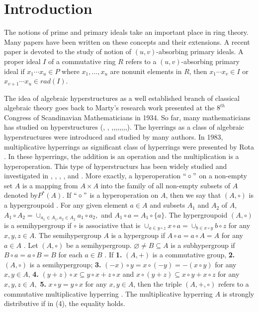 \documentclass[preprint,review,10pt]{amsart}
\theoremstyle{definition}
\theoremstyle{remark}
\numberwithin{equation}{section}
\begin{document}
\section{Introduction}
The notions of prime and primary ideals take an important place  in ring theory. Many papers have been written on these concepts and their extensions. A recent paper \cite{Khali} is devoted to the study of notion of $(u,v)$-absorbing  primary ideals. A proper ideal $I$ of a commutative ring $R$ refers to  a $(u,v)$-absorbing  primary ideal if    $x_1  \cdots  x_u \in  P$  where $x_1,\ldots,x_u$ are nonunit elements in $R$, then  $x_1  \cdots  x_v \in I$ or $x_{v+1}  \cdots  x_u \in rad(I)$.

The idea of algebraic hyperstructures as a well established branch of classical algebraic theory goes back to
Marty's research work \cite{marty} presented  at the $8^{th}$ Congress of Scandinavian Mathematicians in 1934. So far, many mathematicians has studied on hyperstructures  (\cite{f1}, \cite{f2}, \cite{f4},\cite{f5},\cite{x2},\cite{x1},\cite{f11},\cite{f7},\cite{f17},\cite{f8},\cite{f9}). The hyerrings as a  class of algebraic hyperstructures were introduced and studied by many authors. In 1983, multiplicative hyperrings as  significant class of hyperrings were presented by Rota \cite{f14}. In these hyperrings, the addition is an operation and the multiplication is a hyperoperation.  This type of hyperstructurs  has been widely studied and investigated in \cite{ameri}, \cite{ameri5}, \cite{ameri6},  \cite{Ciampi},  \cite{Kamali} and \cite{f16}. More exactly, a  hyperoperation $``\circ" $ on a non-empty set $A$ is a mapping from $A \times A$ into  the family of all non-empty subsets of $A$ denoted by$P^*(A)$.  If $``\circ" $ is a hyperoperation on  $A$, then we say that $(A,\circ)$  is a  hypergroupoid \cite{f10}.  For any given element $a \in A$ and subsets  $A_1$ and $A_2$ of $A$,  $A_1 \circ A_2 =\cup_{a_1 \in A_1, a_2 \in A_2}a_1 \circ a_2,$ and $ A_1 \circ a=A_1 \circ \{a\}.$  The  hypergroupoid $(A, \circ)$ is   a semihypergroup if $\circ$ is associative that is $\cup_{a \in y \circ z}x \circ a=\cup_{b \in x \circ y} b \circ z $ for any $x,y,z \in A$. The semihypergroup $A$ is  a hypergroup if  $A\circ a=a \circ A=A$ for any  $a \in A$ \cite{f10}. Let $(A,\circ)$ be a semihypergroup. $\varnothing \neq B \subseteq A$ is a subhypergroup if   $B \circ a=a \circ B=B$ for each $a \in B$ \cite{f10}.    If  {\bf 1.} $(A,+)$ is a commutative group,  {\bf 2.} $(A,\circ)$ is a semihypergroup; 
{\bf 3.} $(-x)\circ y =x\circ (-y) =  -(x\circ y)$ for any $x, y \in A$,
{\bf 4.}  $(y+z)\circ x \subseteq y\circ x+z\circ x$ and  $x\circ (y+z) \subseteq x\circ y+x\circ z$ for any $x, y, z \in A, $
{\bf 5.} $x \circ y =y \circ x$ for any $x,y \in A$, then the triple  $(A,+,\circ)$ refers to a  commutative multiplicative hyperring  \cite{f10}. The multiplicative hyperring $A$ is  strongly distributive if in (4), the equality holds.
\end{document}
